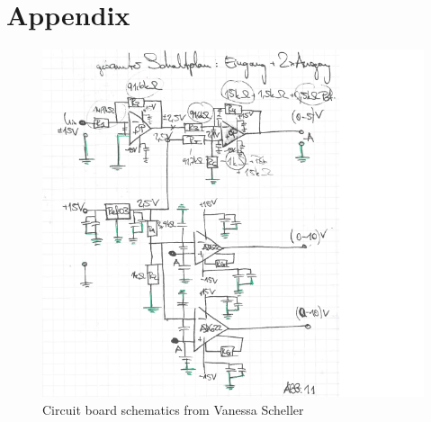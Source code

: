 \documentclass[12pt]{scrartcl}
\begin{document}
  \section{Appendix}
    \begin{figure}[h!]
      \centering
      \includegraphics[width = \textwidth]{schaltplanvan.png}
      \caption{Circuit board schematics from Vanessa Scheller}
      \label{fig20}
    \end{figure}
\end{document}
